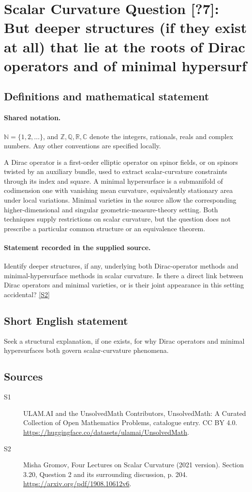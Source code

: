 \documentclass[11pt]{article}
\newcommand{\sref}[2]{\hyperlink{source:#1:#2}{[S#2]}}
\begin{document}
\section{Scalar Curvature Question [?7]: But deeper structures (if they exist at all) that lie at the roots of Dirac operators and of minimal hypersurf}\label{statement}

\subsection{Definitions and mathematical statement}

\paragraph{Shared notation.}$\mathbb N=\{1,2,\ldots\}$, and $\mathbb Z,\mathbb Q,\mathbb R,\mathbb C$ denote the integers, rationals, reals and complex numbers. Any other conventions are specified locally.


A Dirac operator is a first-order elliptic operator on spinor fields, or on spinors twisted by an auxiliary bundle, used to extract scalar-curvature constraints through its index and square. A minimal hypersurface is a submanifold of codimension one with vanishing mean curvature, equivalently stationary area under local variations. Minimal varieties in the source allow the corresponding higher-dimensional and singular geometric-measure-theory setting. Both techniques supply restrictions on scalar curvature, but the question does not prescribe a particular common structure or an equivalence theorem.
\paragraph{Statement recorded in the supplied source.}
Identify deeper structures, if any, underlying both Dirac-operator methods and minimal-hypersurface methods in scalar curvature. Is there a direct link between Dirac operators and minimal varieties, or is their joint appearance in this setting accidental? \sref{statement}{2}
\subsection{Short English statement}
Seek a structural explanation, if one exists, for why Dirac operators and minimal hypersurfaces both govern scalar-curvature phenomena.
\subsection{Sources}
\begin{description}
\item[\hypertarget{source:statement:1}{S1}] ULAM.AI and the UnsolvedMath Contributors, UnsolvedMath: A Curated Collection of Open Mathematics Problems, catalogue entry. CC BY 4.0. \url{https://huggingface.co/datasets/ulamai/UnsolvedMath}.
\item[\hypertarget{source:statement:2}{S2}] Misha Gromov, Four Lectures on Scalar Curvature (2021 version). Section 3.20, Question 2 and its surrounding discussion, p. 204. \url{https://arxiv.org/pdf/1908.10612v6}.
\end{description}
\label{end:statement}
\end{document}
